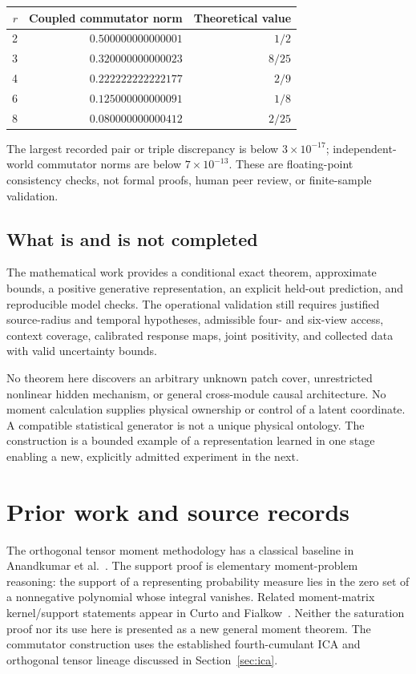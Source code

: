 \documentclass[11pt]{article}
\theoremstyle{definition}
\theoremstyle{remark}
\begin{document}
\begin{center}
\begin{tabular}{@{}rrr@{}}
\toprule
$r$ & Coupled commutator norm & Theoretical value\\
\midrule
2 & $0.500000000000001$ & $1/2$\\
3 & $0.320000000000023$ & $8/25$\\
4 & $0.222222222222177$ & $2/9$\\
6 & $0.125000000000091$ & $1/8$\\
8 & $0.080000000000412$ & $2/25$\\
\bottomrule
\end{tabular}
\end{center}
The largest recorded pair or triple discrepancy is below
$3\times10^{-17}$; independent-world commutator norms are below
$7\times10^{-13}$. These are floating-point consistency checks, not
formal proofs, human peer review, or finite-sample validation.

\subsection{What is and is not completed}

The mathematical work provides a conditional exact theorem, approximate
bounds, a positive generative representation, an explicit held-out
prediction, and reproducible model checks. The operational validation
still requires justified source-radius and temporal hypotheses, admissible
four- and six-view access, context coverage, calibrated response maps,
joint positivity, and collected data with valid uncertainty bounds.

No theorem here discovers an arbitrary unknown patch cover, unrestricted
nonlinear hidden mechanism, or general cross-module causal architecture.
No moment calculation supplies physical ownership or control of a latent
coordinate. A compatible statistical generator is not a unique physical
ontology. The construction is a bounded example of a representation
learned in one stage enabling a new, explicitly admitted experiment in
the next.

\section{Prior work and source records}
\label{sec:sources}

The orthogonal tensor moment methodology has a classical baseline in
Anandkumar et al.~\cite{anandkumar}. The support proof is elementary
moment-problem reasoning: the support of a representing probability
measure lies in the zero set of a nonnegative polynomial whose integral
vanishes. Related moment-matrix kernel/support statements appear in
Curto and Fialkow~\cite{curto}. Neither the saturation proof nor its use
here is presented as a new general moment theorem. The commutator
construction uses the established fourth-cumulant ICA and orthogonal
tensor lineage discussed in Section~\ref{sec:ica}.
\end{document}
